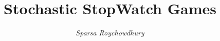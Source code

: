 \documentclass{beamer}
\title{Stochastic StopWatch Games} %
\author{\emph{Sparsa Roychowdhury}}
\begin{document}
  \frame{\maketitle}

   
   
\end{document}
